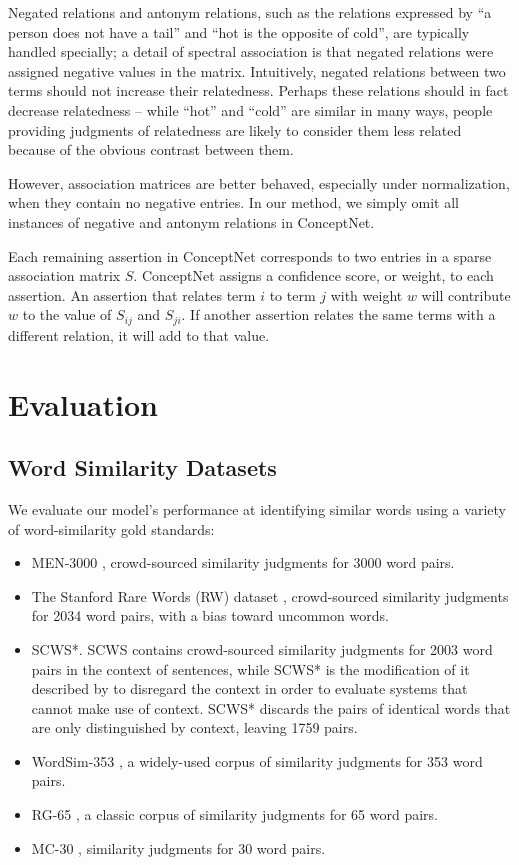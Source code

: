 \documentclass[letterpaper]{article}
\begin{document}
Negated relations and antonym relations, such as the relations expressed by
``a person does not have a tail'' and ``hot is the opposite of cold'', are
typically handled specially; a detail of spectral association is that negated
relations were assigned negative values in the matrix. Intuitively, negated
relations between two terms should not increase their relatedness. Perhaps
these relations should in fact decrease relatedness -- while ``hot'' and
``cold'' are similar in many ways, people providing judgments of relatedness
are likely to consider them less related because of the obvious contrast
between them.

However, association matrices are better behaved, especially under
normalization, when they contain no negative entries. In our method, we simply
omit all instances of negative and antonym relations in ConceptNet.

Each remaining assertion in ConceptNet corresponds to two entries in a sparse
association matrix $S$. ConceptNet assigns a confidence score, or weight, to each
assertion. An assertion that relates term $i$ to term $j$ with weight $w$ will
contribute $w$ to the value of $S_{ij}$ and $S_{ji}$. If another assertion relates
the same terms with a different relation, it will add to that value.


\section{Evaluation}

\subsection{Word Similarity Datasets}

We evaluate our model's performance at identifying similar words using a
variety of word-similarity gold standards:

\begin{itemize}
\item MEN-3000 \cite{bruni2014men}, crowd-sourced similarity judgments for 3000
    word pairs.
\item The Stanford Rare Words (RW) dataset \cite{luong2013rw}, crowd-sourced
    similarity judgments for 2034 word pairs, with a bias toward uncommon words.
\item SCWS*. SCWS \cite{huang2012scws} contains crowd-sourced similarity
    judgments for 2003 word pairs in the context of sentences, while SCWS* is
    the modification of it described by 
    to disregard the context in order to evaluate
    systems that cannot make use of context. SCWS* discards the pairs of
    identical words that are only distinguished by context, leaving 1759 pairs.
\item WordSim-353 \cite{finkelstein2001ws}, a widely-used corpus of similarity
    judgments for 353 word pairs.
\item RG-65 \cite{rubinstein1965rg}, a classic corpus of similarity judgments
    for 65 word pairs.
\item MC-30 \cite{miller1991mc}, similarity judgments for 30 word pairs.
\end{itemize}
\end{document}
